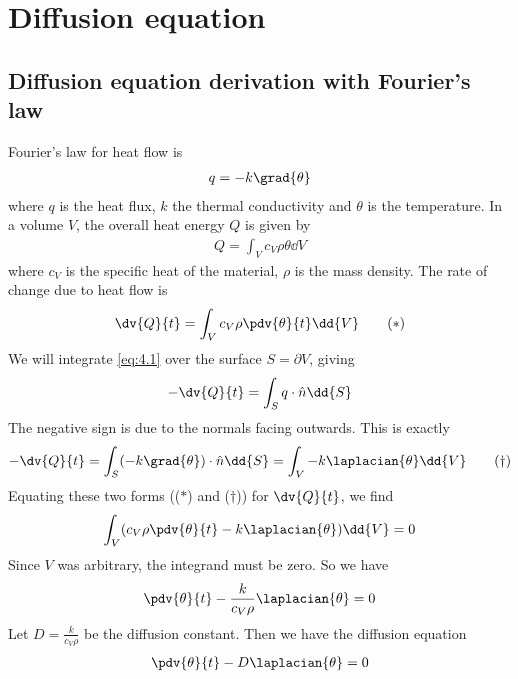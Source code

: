 \section{Diffusion equation}
\subsection{Diffusion equation derivation with Fourier's law}
Fourier's law for heat flow is
\begin{align} \label{eq:4.1}
	q = -k \grad{\theta}
\end{align}
where $q$ is the heat flux, $k$ the thermal conductivity and $\theta$ is the temperature.
In a volume $V$, the overall heat energy $Q$ is given by
\begin{align} \label{eq:4.2}
	Q = \int_V c_V \rho \theta \dd{V}
\end{align}
where $c_V$ is the specific heat of the material, $\rho$ is the mass density.
The rate of change due to heat flow is
\begin{align*}
	\dv{Q}{t} = \int_V c_V \rho \pdv{\theta}{t} \dd{V} \tag{$\ast$}
\end{align*}
We will integrate \cref{eq:4.1} over the surface $S = \partial V$, giving
\begin{align*}
	-\dv{Q}{t} = \int_S q \cdot \hat n \dd{S}
\end{align*}
The negative sign is due to the normals facing outwards.
This is exactly
\begin{align*}
	-\dv{Q}{t} = \int_S (-k \grad{\theta}) \cdot \hat n \dd{S} = \int_V -k \laplacian{\theta} \dd{V} \tag{$\dagger$}
\end{align*}
Equating these two forms (($\ast$) and ($\dagger$)) for $\dv{Q}{t}$, we find
\begin{align*}
	\int_V (c_V \rho \pdv{\theta}{t} - k \laplacian{\theta}) \dd{V} = 0
\end{align*}
Since $V$ was arbitrary, the integrand must be zero.
So we have
\begin{align*}
	\pdv{\theta}{t} - \frac{k}{c_V \rho} \laplacian{\theta} = 0
\end{align*}
Let $D = \frac{k}{c_V \rho}$ be the diffusion constant.
Then we have the diffusion equation
\begin{align} \label{eq:4.3}
	\pdv{\theta}{t} - D \laplacian{\theta} = 0
\end{align}

